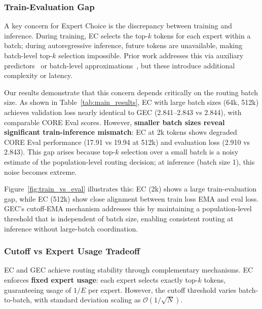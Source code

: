 \documentclass{article}
\theoremstyle{plain}
\theoremstyle{definition}
\theoremstyle{remark}
\begin{document}
\subsubsection{Train-Evaluation Gap}
\label{sec:train_inference}

A key concern for Expert Choice is the discrepancy between training and inference. During training, EC selects the top-$k$ tokens for each expert within a batch; during autoregressive inference, future tokens are unavailable, making batch-level top-$k$ selection impossible. Prior work addresses this via auxiliary predictors~\cite{raposo2024mixture} or batch-level approximations~\cite{ludziejewski2024scaling}, but these introduce additional complexity or latency.

Our results demonstrate that this concern depends critically on the routing batch size. As shown in Table~\ref{tab:main_results}, EC with large batch sizes (64k, 512k) achieves validation loss nearly identical to GEC (2.841--2.843 vs 2.844), with comparable CORE Eval scores. However, \textbf{smaller batch sizes reveal significant train-inference mismatch}: EC at 2k tokens shows degraded CORE Eval performance (17.91 vs 19.94 at 512k) and evaluation loss (2.910 vs 2.843). This gap arises because top-$k$ selection over a small batch is a noisy estimate of the population-level routing decision; at inference (batch size 1), this noise becomes extreme.

Figure~\ref{fig:train_vs_eval} illustrates this: EC (2k) shows a large train-evaluation gap, while EC (512k) show close alignment between train loss EMA and eval loss. GEC's cutoff-EMA mechanism addresses this by maintaining a population-level threshold that is independent of batch size, enabling consistent routing at inference without large-batch coordination.




\subsubsection{Cutoff vs Expert Usage Tradeoff}
\label{sec:cutoff_usage}

EC and GEC achieve routing stability through complementary mechanisms. EC enforces \textbf{fixed expert usage}: each expert selects exactly top-$k$ tokens, guaranteeing usage of $1/E$ per expert. However, the cutoff threshold varies batch-to-batch, with standard deviation scaling as $\mathcal{O}(1/\sqrt{N})$. 
\end{document}
